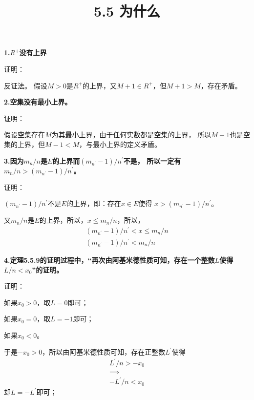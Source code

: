 \documentclass{article}
\theoremstyle{mystyle}
\begin{document}
\title{5.5 为什么}
\maketitle


\textbf{1.$R^{+}$没有上界}

证明：

反证法。
假设$M>0$是$R^{+}$的上界，又$M + 1 \in R^+$，但$M + 1 > M$，存在矛盾。

\textbf{2.空集没有最小上界。}

证明：

假设空集存在$M$为其最小上界，由于任何实数都是空集的上界，
所以$M - 1$也是空集的上界，但$M - 1 < M$，与最小上界的定义矛盾。

\textbf{
  3.因为$m_n/n$是$E$的上界而$(m_{n^\prime}-1)/n^\prime$不是，
  所以一定有$m_n/n > (m_{n^\prime}-1)/n^\prime$。
}

证明：

$(m_{n^\prime}-1)/n^\prime$不是$E$的上界，即：存在$x \in E$使得
$x > (m_{n^\prime}-1)/n^\prime$。

又$m_n/n$是$E$的上界，所以，$x \leq m_n/n$，所以，
\begin{align*}
  (m_{n^\prime}-1)/n^\prime < x \leq m_n/n \\
  (m_{n^\prime}-1)/n^\prime < m_n/n
\end{align*}

\textbf{
  4.定理5.5.9的证明过程中，“再次由阿基米德性质可知，存在一个整数$L$使得$L/n < x_0$”的证明。
}

证明：

如果$x_0 > 0$，取$L = 0$即可；

如果$x_0 = 0$，取$L = -1$即可；

如果$x_0 < 0$。

于是$-x_0 > 0$，所以由阿基米德性质可知，存在正整数$L^\prime$使得
\begin{align*}
  L^\prime / n >  - x_0 \\
  \implies              \\
  -L^\prime / n < x_0
\end{align*}
却$L = - L^\prime$即可；
\end{document}
